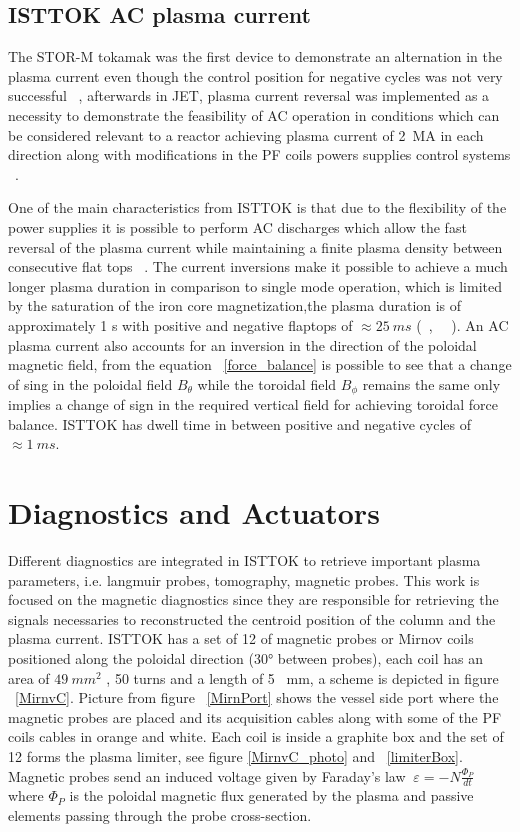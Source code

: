 \subsection{ISTTOK AC plasma current}


The STOR-M tokamak was the first device to demonstrate an alternation in the plasma current even though the control position for negative cycles was not very successful ~\cite{Mitarai1996}, afterwards in JET, plasma current reversal was implemented as a necessity to demonstrate the feasibility of AC operation in conditions which can be considered relevant to a reactor achieving plasma current of 2~MA in each direction along with modifications in the PF coils powers supplies control systems ~\cite{Tubbing1992}.\smallskip

One of the main characteristics from ISTTOK  is that due to the flexibility of the power supplies it is possible  to perform  AC  discharges  which  allow the fast reversal of the plasma current while maintaining a finite plasma density between consecutive flat tops  ~\cite{density}. The current inversions make it possible to achieve a much longer plasma duration in comparison to single mode operation, which is limited by the saturation of the iron core magnetization,the plasma duration is of approximately 1 s with positive and negative flaptops of $\approx 25~ms$ (~\cite{Fernandes1998}, ~\cite{Carvalho2015}~). An AC plasma current also accounts for  an inversion in the direction of the poloidal magnetic field, from the equation ~\ref{force_balance} is possible to see that a change of sing in the poloidal field $B_\theta$ while the toroidal field $B_{\phi}$ remains the same only implies a change of sign in the required vertical field for achieving toroidal force balance. ISTTOK has dwell time in between positive and negative cycles of $\approx 1~ms$.\smallskip


\section{Diagnostics and Actuators}

Different  diagnostics are integrated in ISTTOK to retrieve important plasma parameters, i.e. langmuir probes, tomography, magnetic probes. This work is focused on the magnetic diagnostics  since they are responsible for  retrieving the signals necessaries to reconstructed the centroid position of the column and the plasma current. ISTTOK has a set of 12 of magnetic  probes or Mirnov coils positioned along the poloidal direction (30° between  probes), each coil has an area of $49 ~mm^2$ , 50 turns and a length of 5 ~mm, a scheme is depicted in figure ~\ref{MirnvC}. Picture from figure ~\ref{MirnPort} shows the vessel side port where the magnetic probes are  placed and its acquisition cables along with some of the PF coils cables in orange and white. Each coil is inside a graphite box and the set of 12 forms the plasma limiter, see figure \ref{MirnvC_photo} and ~\ref{limiterBox}. Magnetic probes send an induced voltage given by Faraday's law $~\varepsilon = -N\frac{\Phi_P}{dt}$ where $\Phi_P$ is the poloidal magnetic flux generated by the plasma and passive elements passing through the probe cross-section.
\smallskip



